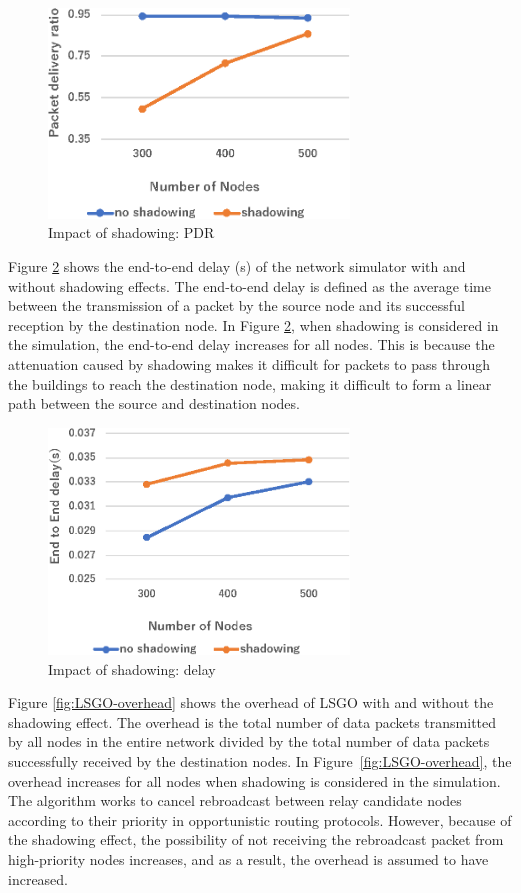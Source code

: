 \documentclass[conference]{IEEEtran}
\begin{document}
\begin{figure}[!ht]
\centering
\includegraphics[width=80mm]{figures/LSGO_PDR.eps}
\caption{Impact of shadowing: PDR }
\label{fig:LSGO-PDR}
\end{figure}


Figure \ref{fig:LSGO-delay} shows the end-to-end delay (s) of the network simulator with and without shadowing effects. The end-to-end delay is defined as the average time between the transmission of a packet by the source node and its successful reception by the destination node.
In Figure \ref{fig:LSGO-delay}, when shadowing is considered in the simulation, the end-to-end delay increases for all nodes. This is because the attenuation caused by shadowing makes it difficult for packets to pass through the buildings to reach the destination node, making it difficult to form a linear path between the source and destination nodes.

\begin{figure}[!ht]
\centering
\includegraphics[width=80mm]{figures/LSGO_delay.eps}
\caption{Impact of shadowing: delay}
\label{fig:LSGO-delay}
\end{figure}

Figure \ref{fig:LSGO-overhead} shows the overhead of LSGO with and without the shadowing effect. 
The overhead is the total number of data packets transmitted by all nodes in the entire network divided by the total number of data packets successfully received by the destination nodes.
In \mbox{Figure \ref{fig:LSGO-overhead}}, the overhead increases for all nodes when shadowing is considered in the simulation.
The algorithm works to cancel rebroadcast between relay candidate nodes according to their priority in opportunistic routing protocols.
However, because of the shadowing effect, the possibility of not receiving the rebroadcast packet from high-priority nodes increases, and as a result, the overhead is assumed to have increased. 
 
\end{document}

